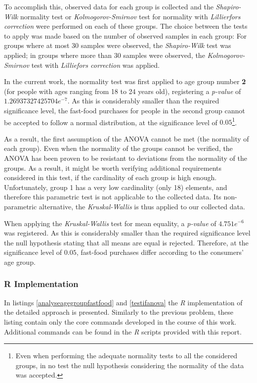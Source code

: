 \documentclass[12pt]{article}
\begin{document}
To accomplish this, observed data for each group is collected and the \emph{Shapiro-Wilk} normality test or \emph{Kolmogorov-Smirnov} test for normality with \emph{Lillierfors correction} were performed on each of these groups. The choice between the tests to apply was made based on the number of observed samples in each group: For groups where at most $30$ samples were observed, the \emph{Shapiro-Wilk} test was applied; in groups where more than $30$ samples were observed, the \emph{Kolmogorov-Smirnov} test with \emph{Lilliefors correction} was applied.

In the current work, the normality test was first applied to age group number \textbf{2} (for people with ages ranging from 18 to 24 years old), registering a \emph{p-value} of $1.26937327425704e^{-7}$. As this is considerably smaller than the required significance level, the fast-food purchases for people in the second group cannot be accepted to follow a normal distribution, at the significance level of $0.05$\footnote{Even when performing the adequate normality tests to all the considered groups, in no test the null hypothesis considering the normality of the data was accepted.}.

As a result, the first assumption of the ANOVA cannot be met (the normality of each group). Even when the normality of the groups cannot be verified, the ANOVA has been proven to be resistant to deviations from the normality of the groups. As a result, it might be worth verifying additional requirements considered in this test, if the cardinality of each group is high enough. Unfortunately, group 1 has a very low cardinality (only 18) elements, and therefore this parametric test is not applicable to the collected data. Its non-parametric alternative, the \emph{Kruskal-Wallis} is thus applied to our collected data.

When applying the \emph{Kruskal-Wallis} test for mean equality, a \emph{p-value} of $4.751e^{-6}$ was registered. As this is considerably smaller than the required significance level the null hypothesis stating that all means are equal is rejected. Therefore, at the significance level of $0.05$, fast-food purchases differ according to the consumers' age group.

\subsubsection{R Implementation}

In listings \ref{analyseagegroupfastfood} and \ref{testifanova} the \emph{R} implementation of the detailed approach is presented. Similarly to the previous problem, these listing contain only the core commands developed in the course of this work. Additional commands can be found in the \emph{R} scripts provided with this report.
\end{document}
